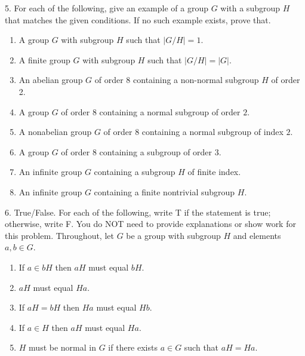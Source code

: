 \documentclass[10pt,openany,oneside]{book}
\theoremstyle{plain}
\theoremstyle{definition}
\theoremstyle{definition}
\theoremstyle{definition}
\theoremstyle{definition}
\numberwithin{equation}{section}
\begin{document}
\begin{exerciselist}
\begin{enumerate}[label=(\alph*)]
\end{enumerate}
%
\par\smallskip
\item[5.]\hypertarget{exercise-54}{}For each of the following, give an example of a group \(G\) with a subgroup \(H\) that matches the given conditions. If no such example exists, prove that. \leavevmode%
\begin{enumerate}[label=(\alph*)]
\item\hypertarget{li-445}{}A group \(G\) with subgroup \(H\) such that \(|G/H|=1\).%
\item\hypertarget{li-446}{}A finite group \(G\) with subgroup \(H\) such that \(|G/H|=|G|\).%
\item\hypertarget{li-447}{}An abelian group \(G\) of order \(8\) containing a non-normal subgroup \(H\) of order 2.%
\item\hypertarget{li-448}{}A group \(G\) of order 8 containing a normal subgroup of order \(2\).%
\item\hypertarget{li-449}{}A nonabelian group \(G\) of order 8 containing a normal subgroup of index \(2\).%
\item\hypertarget{li-450}{}A group \(G\) of order 8 containing a subgroup of order \(3\).%
\item\hypertarget{li-451}{}An infinite group \(G\) containing a subgroup \(H\) of finite index.%
\item\hypertarget{li-452}{}An infinite group \(G\) containing a finite nontrivial subgroup \(H\).%
\end{enumerate}
%
\par\smallskip
\item[6.]\hypertarget{exercise-55}{}True/False. For each of the following, write T if the statement is true; otherwise, write F. You do NOT need to provide explanations or show work for this problem. Throughout, let \(G\) be a group with subgroup \(H\) and elements \(a,b\in G\). \leavevmode%
\begin{enumerate}[label=(\alph*)]
\item\hypertarget{li-461}{}If \(a\in bH\) then \(aH\) must equal \(bH\).%
\item\hypertarget{li-462}{}\(aH\) must equal \(Ha\).%
\item\hypertarget{li-463}{}If \(aH=bH\) then \(Ha\) must equal \(Hb\).%
\item\hypertarget{li-464}{}If \(a\in H\) then \(aH\) must equal \(Ha\).%
\item\hypertarget{li-465}{}\(H\) must be normal in \(G\) if there exists \(a\in G\) such that \(aH=Ha\).%

\end{enumerate}
\end{exerciselist}
\end{document}
